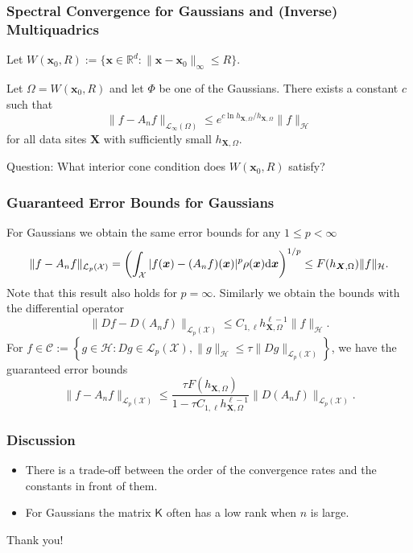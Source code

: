 \documentclass[xcolor=dvipsnames]{beamer}
\newcommand{\cL}{{\mathcal L}}
\newcommand{\bx}{{\boldsymbol{x}}}
\newcommand{\bX}{{\boldsymbol{X}}}
\newcommand{\cC}{\mathcal{C}}
\newcommand{\cH}{\mathcal{H}}
\newcommand{\cX}{\mathcal{X}}
\newcommand{\mK}{\mathsf{K}}
\newcommand{\reals}{\mathbb{R}}
\newcommand{\dif}{\rm d}
\begin{document}
\begin{frame}
  \frametitle{Spectral Convergence for Gaussians and (Inverse)
    Multiquadrics}
  Let $W(\bx_0,R):=\{\bx\in\reals^d:\|\bx-\bx_0\|_\infty\le R\}$.
  \begin{theorem}[Wendland, 2005]
    Let $\Omega=W(\bx_0,R)$ and let $\Phi$ be one of the Gaussians. There exists a constant $c$ such that
    $$\|f-A_nf\|_{\cL_\infty(\Omega)}\le e^{c\ln h_{\bX,\Omega}/h_{\bX,\Omega}}\|f\|_\cH$$
    for all data sites $\bX$ with sufficiently small $h_{\bX,\Omega}$.
  \end{theorem}
Question: What interior cone condition does $W(\bx_0,R)$ satisfy?
\end{frame}

\begin{frame}
  \frametitle{Guaranteed Error Bounds for Gaussians}
  For Gaussians we obtain the same error bounds for any $1\le p<\infty$
  $$\|f-A_nf\|_{\cL_p(\cX)}=\left(\int_\cX|f(\bx)-(A_nf)(\bx)|^p\rho(\bx)\dif\bx\right)^{1/p}\le F(h_{\bX,\Omega})\|f\|_\cH.$$
  Note that this result also holds for $p=\infty$. Similarly we obtain the bounds with the differential operator
  $$\|Df-D(A_nf)\|_{\cL_p(\cX)}\le C_{1,\ell}h_{\bX,\Omega}^{\ell-1}\|f\|_\cH.$$
  For $f\in\cC:=\left\{g\in\cH:Dg\in\cL_p(\cX),\|g\|_\cH\le\tau\|Dg\|_{\cL_p(\cX)}\right\}$, we have the guaranteed error bounds
  $$\|f-A_nf\|_{\cL_p(\cX)}\le\frac{\tau F(h_{\bX,\Omega})}{1-\tau C_{1,\ell}h_{\bX,\Omega}^{\ell-1}}\|D(A_nf)\|_{\cL_p(\cX)}.$$
\end{frame}

\begin{frame}
  \frametitle{Discussion}
  \begin{itemize}
    \item There is a trade-off between the order of the convergence rates and the constants in front of them.
    \item For Gaussians the matrix $\mK$ often has a low rank when $n$ is large.
  \end{itemize}
  \begin{center}
    \huge{Thank you!}

  \end{center}
\end{frame}
\end{document}
